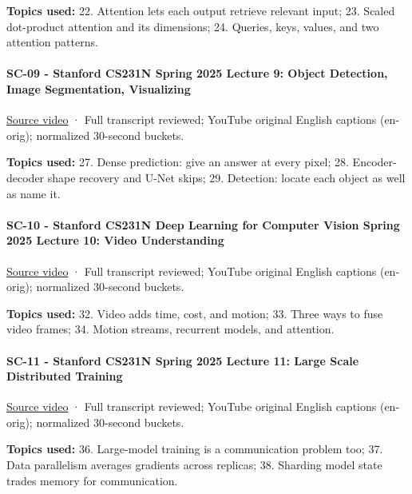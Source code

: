 \textbf{Topics used:} 22. Attention lets each output retrieve relevant input; 23. Scaled dot-product attention and its dimensions; 24. Queries, keys, values, and two attention patterns.

\paragraph{SC-09 - Stanford CS231N Spring 2025 Lecture 9: Object Detection, Image Segmentation, Visualizing}\label{sc-09---stanford-cs231n-spring-2025-lecture-9-object-detection-image-segmentation-visualizing}

\href{https://www.youtube.com/watch?v=PTypu6GqEd4}{Source video} · Full transcript reviewed; YouTube original English captions (en-orig); normalized 30-second buckets.

\textbf{Topics used:} 27. Dense prediction: give an answer at every pixel; 28. Encoder-decoder shape recovery and U-Net skips; 29. Detection: locate each object as well as name it.

\paragraph{SC-10 - Stanford CS231N Deep Learning for Computer Vision Spring 2025 Lecture 10: Video Understanding}\label{sc-10---stanford-cs231n-deep-learning-for-computer-vision-spring-2025-lecture-10-video-understanding}

\href{https://www.youtube.com/watch?v=wElqklprhPE}{Source video} · Full transcript reviewed; YouTube original English captions (en-orig); normalized 30-second buckets.

\textbf{Topics used:} 32. Video adds time, cost, and motion; 33. Three ways to fuse video frames; 34. Motion streams, recurrent models, and attention.

\paragraph{SC-11 - Stanford CS231N Spring 2025 Lecture 11: Large Scale Distributed Training}\label{sc-11---stanford-cs231n-spring-2025-lecture-11-large-scale-distributed-training}

\href{https://www.youtube.com/watch?v=9MvD-XsowsE}{Source video} · Full transcript reviewed; YouTube original English captions (en-orig); normalized 30-second buckets.

\textbf{Topics used:} 36. Large-model training is a communication problem too; 37. Data parallelism averages gradients across replicas; 38. Sharding model state trades memory for communication.

